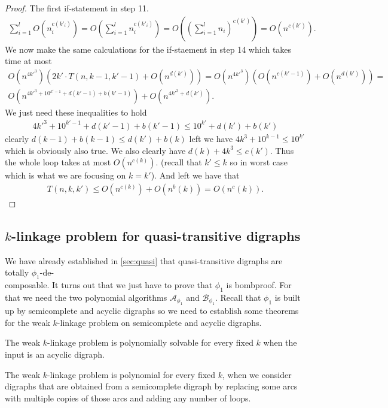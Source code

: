 \begin{proof}
    The first if-statement in step 11.
    \begin{align}
        \sum_{i=1}^lO(n_i^{c(k'_i)})=O(\sum_{i=1}^ln_i^{c(k'_i)})=O((\sum_{i=1}^ln_i)^{c(k')})=O(n^{c(k')}).
    \end{align}
    We now make the same calculations for the if-staement in step 14 which takes time at most
    \begin{align}
        O(n^{4k'^3})(2k'\cdot T(n,k-1,k'-1)+O(n^{d(k')}))=O(n^{4k'^3})(O(n^{c(k'-1)})+O(n^{d(k')}))=\\
        O(n^{4k'^3+10^{k'-1}+d(k'-1)+b(k'-1)})+O(n^{4k'^3+d(k')}).
    \end{align}
    We just need these inequalities to hold
    \begin{align}
        4k'^3+10^{k'-1}+d(k'-1)+b(k'-1)\leq 10^{k'}+d(k')+b(k')
    \end{align}
    clearly $d(k-1)+b(k-1)\leq d(k')+b(k)$ left we have $4k^3+10^{k-1} \leq 10^{k'}$ which is obviously also true.
    We also clearly have $d(k)+4k^3\leq c(k')$.
    Thus the whole loop takes at most $O(n^{c(k)})$. (recall that $k'\leq k$ so in worst case which is what we are focusing on $k=k'$).
    And left we have that 
    \begin{align}
        T(n,k,k')\leq O(n^{c(k)})+O(n^b(k))=O(n^c(k)).
    \end{align}
\end{proof}

\subsection{$k$-linkage problem for quasi-transitive digraphs}
We have already established in \autoref{sec:quasi} that quasi-transitive digraphs are totally $\phi_1$-de-\\composable.
It turns out that we just have to prove that $\phi_1$ is bombproof. 
For that we need the two polynomial algorithms $\mathcal{A}_{\phi_1}$ and $\mathcal{B}_{\phi_1}$. Recall that $\phi_1$ is built up by semicomplete and acyclic digraphs so we need to establish some theorems for the weak $k$-linkage problem on semicomplete and acyclic digraphs.
\begin{thm}
    The weak $k$-linkage problem is polynomially solvable for every fixed $k$ when the input is an acyclic digraph.
\end{thm}
\begin{thm}
    The weak $k$-linkage problem is polynomial for every fixed $k$, when we consider digraphs that are obtained from a semicomplete digraph by replacing some arcs with multiple copies of those arcs and adding any number of loops.
\end{thm}

